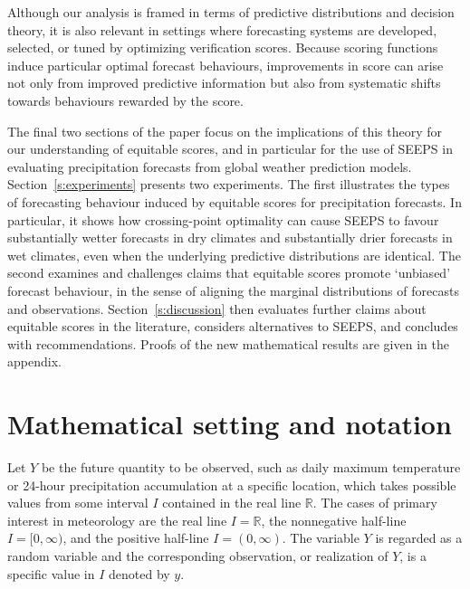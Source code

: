 \documentclass[10pt]{article} %
\theoremstyle{theorem}
\theoremstyle{definition}
\newcommand{\RRR}{\mathbb{R}}
\begin{document}
Although our analysis is framed in terms of predictive distributions and decision theory, it is also relevant in settings where forecasting systems are developed, selected, or tuned by optimizing verification scores. Because scoring functions induce particular optimal forecast behaviours, improvements in score can arise not only from improved predictive information but also from systematic shifts towards behaviours rewarded by the score.

The final two sections of the paper focus on the implications of this theory for our understanding of equitable scores, and in particular for the use of SEEPS in evaluating precipitation forecasts from global weather prediction models. Section~\ref{s:experiments} presents two experiments. The first illustrates the types of forecasting behaviour induced by equitable scores for precipitation forecasts. In particular, it shows how crossing-point optimality can cause SEEPS to favour substantially wetter forecasts in dry climates and substantially drier forecasts in wet climates, even when the underlying predictive distributions are identical. The second examines and challenges claims that equitable scores promote `unbiased' forecast behaviour, in the sense of aligning the marginal distributions of forecasts and observations. Section~\ref{s:discussion} then evaluates further claims about equitable scores in the literature, considers alternatives to SEEPS, and concludes with recommendations. Proofs of the new mathematical results are given in the appendix.

\section{Mathematical setting and notation}

Let $Y$ be the future quantity to be observed, such as daily maximum temperature or 24-hour precipitation accumulation at a specific location, which takes possible values from some interval $I$ contained in the real line $\RRR$. The cases of primary interest in meteorology are the real line $I=\RRR$, the nonnegative half-line $I=[0,\infty)$, and the positive half-line $I=(0,\infty)$. The variable $Y$ is regarded as a random variable and the corresponding observation, or realization of $Y$, is a specific value in $I$ denoted by $y$.
\end{document}
